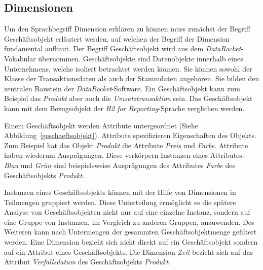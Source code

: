 \documentclass[
  language=german, %
  type=bachelor%
]{isthesis}
\begin{document}
\begin{content}
  \subsection{Dimensionen}\label{subsec:dimension}
  Um den Sprachbegriff Dimension erklären zu können muss zunächst der Begriff
  Geschäftsobjekt erläutert werden, auf welchen der Begriff der Dimension
  fundamental aufbaut. Der Begriff Geschäftsobjekt wird aus dem
  \textit{DataRocket}-Vokabular übernommen. Geschäftsobjekte sind Datenobjekte
  innerhalb eines Unternehmens, welche isoliert betrachtet werden können. Sie
  können sowohl der Klasse der Transaktionsdaten als auch der Stammdaten
  angehören. Sie bilden den zentralen Baustein der
  \textit{DataRocket}-Software. Ein Geschäftsobjekt kann zum Beispiel das
  \textit{Produkt} aber auch die \textit{Umsatztransaktion} sein.  Das
  Geschäftsobjekt kann mit dem Bezugsobjekt der \textit{H2 for
  Reporting}-Sprache verglichen werden. 

  \begin{figure}[caption={Teilsprache---Geschäftsobjekt}, label={geschaeftsobjekt}]
    \resizebox{200px}{!}{}
  \end{figure}

  Einem Geschäftsobjekt werden Attribute untergeordnet (Siehe
  Abbildung~\ref{geschaeftsobjekt}). Attribute spezifizieren Eigenschaften des
  Objekts. Zum Beispiel hat das Objekt \textit{Produkt} die Attribute
  \textit{Preis} und \textit{Farbe}. Attribute haben wiederum Ausprägungen.
  Diese verkörpern Instanzen eines Attributes. \textit{Blau} und \textit{Grün}
  sind beispielsweise Ausprägungen des Attributes \textit{Farbe} des
  Geschäftsobjekts \textit{Produkt}.
  
  Instanzen eines Geschäftsobjekts können mit der Hilfe von Dimensionen in
  Teilmengen gruppiert werden. Diese Unterteilung ermöglicht es die spätere
  Analyse von Geschäftsobjekten nicht nur auf eine einzelne Instanz, sondern
  auf eine Gruppe von Instanzen, \ggf{} im Vergleich zu anderen Gruppen,
  anzuwenden. Des Weiteren kann nach Untermengen der gesammten Geschäftsobjektmenge
  gefiltert werden.  Eine Dimension bezieht sich nicht direkt auf ein
  Geschäftsobjekt sondern auf ein Attribut eines Geschäftsobjekts. Die
  Dimension \textit{Zeit} bezieht sich \zB{} auf das Attribut
  \textit{Verfallsdatum} des Geschäftsobjekts \textit{Produkt}. 

  \begin{figure}[caption={Teilsprache---Dimension}, label={dimension-erm}]
    \resizebox{350px}{!}{}
  \end{figure}
  

\end{content}
\end{document}
